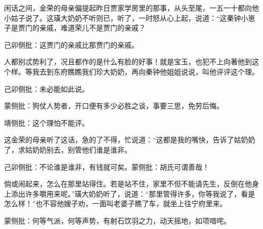 \begin{parag}


    闲话之间，金荣的母亲偏提起昨日贾家学房里的那事，从头至尾，一五一十都向他小姑子说了。这璜大奶奶不听则已，听了，一时怒从心上起，说道：“这秦钟小崽子是贾门的亲戚，难道荣儿不是贾门的亲戚？\begin{note}己卯侧批：这贾门的亲戚比那贾门的亲戚。\end{note}人都别忒势利了，况且都作的是什么有脸的好事！就是宝玉，也犯不上向著他到这个样。等我去到东府瞧瞧我们珍大奶奶，再向秦钟他姐姐说说，叫他评评这个理。\begin{note}己卯侧批：未必能如此说。\end{note}\begin{note}蒙侧批：狗仗人势者，开口便有多少必胜之谈，事要三思，免劳后悔。\end{note}\begin{note}靖侧批：这个理怕不能评。\end{note}这金荣的母亲听了这话，急的了不得，忙说道：“这都是我的嘴快，告诉了姑奶奶了，求姑奶奶别去，别管他们谁是谁非。\begin{note}己卯侧批：不论谁是谁非，有钱就可矣。蒙侧批：胡氏可谓善哉！\end{note}倘或闹起来，怎么在那里站得住。若是站不住，家里不但不能请先生，反倒在他身上添出许多嚼用来呢。”璜大奶奶听了，说道：“那里管得许多，你等我说了，看是怎么样！”也不容他嫂子劝，一面叫老婆子瞧了车，就坐上往宁府里来。\begin{note}蒙侧批：何等气派，何等声势，有射石饮羽之力，动天摇地，如项喑咤。\end{note}
\end{parag}


